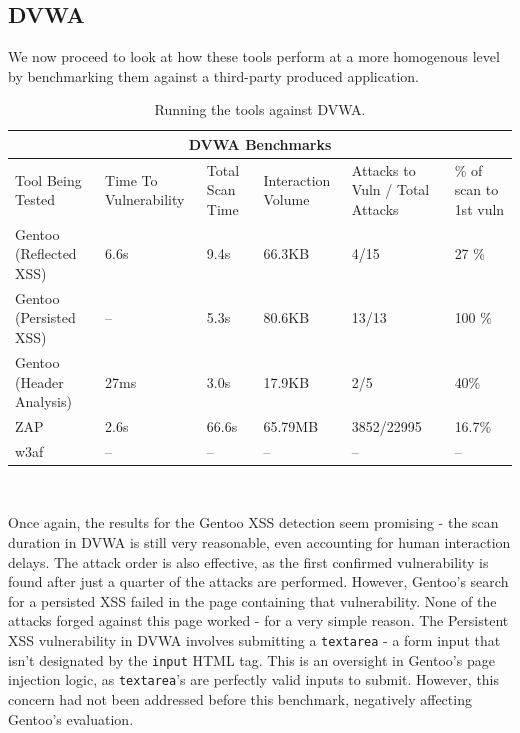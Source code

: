 \subsection{DVWA}

We now proceed to look at how these tools perform at a more homogenous level by benchmarking them against a third-party produced application. \\
\begin{table}[h]
	
	{

		\captionsetup{justification=centering}		
		\caption{Running the tools against DVWA.}
		\label{table:dvwa_benchmarks}
		\begin{tabular}{ |p{4cm}||p{1.4cm}|p{1.4cm}|p{1.6cm}|p{2cm}|p{2cm}| }
			\hline
			\multicolumn{6}{|c|}{\textbf{DVWA Benchmarks}} \\ [0.5ex]
			\hline \hline 
			Tool Being Tested& Time To Vulnerability & Total Scan Time & Interaction Volume & Attacks to Vuln / Total Attacks & \% of scan to 1st vuln \\
			\hline
			Gentoo (Reflected XSS)    & 6.6s      & 9.4s    &   66.3KB          & 4/15 & 27 \% \\
			Gentoo (Persisted XSS)    &  -- & 5.3s & 80.6KB & 13/13 & 100 \% \\
			Gentoo (Header Analysis) & 27ms    &  3.0s    & 17.9KB   &  2/5 & 40\%\\
			ZAP                                  & 2.6s & 66.6s     &  65.79MB & 3852/22995& 16.7\%\\ 
			w3af                                 & -- & -- & -- & -- &-- \\
			\hline
		\end{tabular}
	} \\
\end{table}

Once again, the results for the Gentoo XSS detection seem promising - the scan duration in DVWA is still very reasonable, even accounting for human interaction delays. The attack order is also effective, as the first confirmed vulnerability is found after just a quarter of the attacks are performed. However, Gentoo's search for a persisted XSS failed in the page containing that vulnerability. None of the attacks forged against this page worked - for a very simple reason. The Persistent XSS vulnerability in DVWA involves submitting a \texttt{textarea} - a form input that isn't designated by the \texttt{input} HTML tag. This is an oversight in Gentoo's page injection logic, as \texttt{textarea}'s are perfectly valid inputs to submit. However, this concern had not been addressed before this benchmark, negatively affecting Gentoo's evaluation. \\

